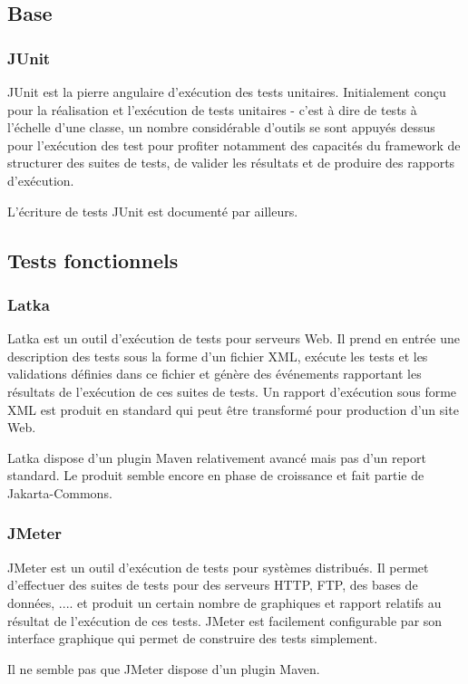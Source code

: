 \subsection{Base}
  
\subsubsection{JUnit}
  JUnit est la pierre angulaire d'ex\'ecution des tests
    unitaires. Initialement con\c{c}u pour la r\'ealisation et l'ex\'ecution
    de tests unitaires - c'est \`a dire de tests \`a l'\'echelle d'une
    classe, un nombre consid\'erable d'outils se sont appuy\'es dessus
    pour l'ex\'ecution des test pour profiter notamment  des capacit\'es
    du framework de structurer des suites de tests, de valider les
    r\'esultats et de produire des rapports d'ex\'ecution.
    
\par
  L'\'ecriture de tests JUnit est document\'e par ailleurs.

\par
  
\subsection{Tests fonctionnels}
  
\subsubsection{Latka}
  
     Latka est un outil d'ex\'ecution de tests pour serveurs Web. Il
     prend en entr\'ee une description des tests sous la forme d'un
     fichier XML, ex\'ecute les tests et les validations d\'efinies dans
     ce fichier et g\'en\`ere des \'ev\'enements rapportant les r\'esultats de
     l'ex\'ecution de ces suites de tests. Un rapport d'ex\'ecution sous
     forme XML est produit en standard qui peut \^etre transform\'e pour
     production d'un site Web.
    
\par
  Latka dispose d'un plugin Maven relativement avanc\'e mais pas
    d'un report standard. Le produit semble encore en phase de
    croissance et fait partie de Jakarta-Commons. 
\par
  
\subsubsection{JMeter}
  JMeter est un outil d'ex\'ecution de tests pour syst\`emes
    distribu\'es. Il permet d'effectuer des suites de tests pour des
    serveurs HTTP, FTP, des bases de donn\'ees, .... et produit un
    certain nombre de graphiques et rapport relatifs au r\'esultat de
    l'ex\'ecution de ces tests. JMeter est facilement configurable par
    son interface graphique qui permet de construire des tests
     simplement.
\par
  Il ne semble pas que JMeter dispose d'un
    plugin Maven.
\par
  
